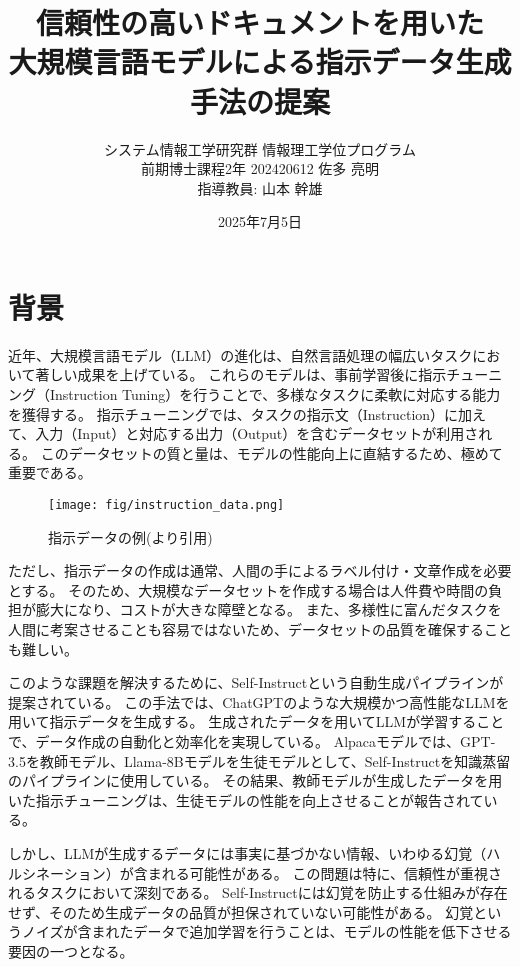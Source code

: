 \documentclass[twocolumn]{jsarticle}
\begin{document}
\title{\vspace{-3cm}信頼性の高いドキュメントを用いた\\
大規模言語モデルによる指示データ生成手法の提案}
\author{
    システム情報工学研究群 情報理工学位プログラム\\
    前期博士課程2年 202420612 佐多 亮明\\
    指導教員: 山本 幹雄
}
\date{2025年7月5日}
\maketitle


\section{背景}
近年、大規模言語モデル（LLM）の進化は、自然言語処理の幅広いタスクにおいて著しい成果を上げている。
これらのモデルは、事前学習後に指示チューニング（Instruction Tuning）\cite{Instruction-Tuning}を行うことで、多様なタスクに柔軟に対応する能力を獲得する。
指示チューニングでは、タスクの指示文（Instruction）に加えて、入力（Input）と対応する出力（Output）を含むデータセットが利用される。
このデータセットの質と量は、モデルの性能向上に直結するため、極めて重要である。
\begin{figure}[htbp]
    \centering 
    \texttt{[image: fig/instruction\_data.png]}
    \caption{指示データの例(\cite{Self-Instruct}より引用)}
\end{figure}
ただし、指示データの作成は通常、人間の手によるラベル付け・文章作成を必要とする。
そのため、大規模なデータセットを作成する場合は人件費や時間の負担が膨大になり、コストが大きな障壁となる。
また、多様性に富んだタスクを人間に考案させることも容易ではないため、データセットの品質を確保することも難しい。

このような課題を解決するために、Self-Instruct\cite{Self-Instruct}という自動生成パイプラインが提案されている。
この手法では、ChatGPTのような大規模かつ高性能なLLMを用いて指示データを生成する。
生成されたデータを用いてLLMが学習することで、データ作成の自動化と効率化を実現している。
Alpacaモデル\cite{Alpaca}では、GPT-3.5を教師モデル、Llama-8Bモデル\cite{Llama}を生徒モデルとして、Self-Instructを知識蒸留のパイプラインに使用している。
その結果、教師モデルが生成したデータを用いた指示チューニングは、生徒モデルの性能を向上させることが報告されている。

しかし、LLMが生成するデータには事実に基づかない情報、いわゆる幻覚（ハルシネーション）が含まれる可能性がある。
この問題は特に、信頼性が重視されるタスクにおいて深刻である。
Self-Instructには幻覚を防止する仕組みが存在せず、そのため生成データの品質が担保されていない可能性がある。
幻覚というノイズが含まれたデータで追加学習を行うことは、モデルの性能を低下させる要因の一つとなる。
\end{document}
